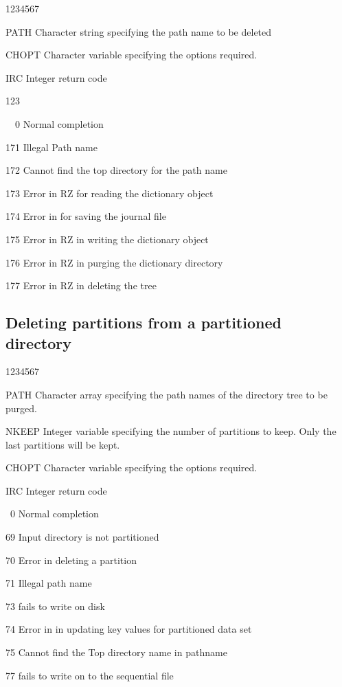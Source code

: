 \begin{DLtt}{1234567}
\item[PATH]Character string specifying the path name
  to be deleted
\item[CHOPT]Character variable specifying the options required.
\item[IRC]Integer return code
  \begin{DLtt}{123}
    \item[\ \ 0]Normal completion
    \item[171]Illegal Path name
    \item[172]Cannot find the top directory for the path name
    \item[173]Error in RZ for reading the dictionary object
    \item[174]Error in  for saving the journal file
    \item[175]Error in RZ in writing the dictionary object
    \item[176]Error in RZ in purging the dictionary directory
    \item[177]Error in RZ in deleting the tree
  \end{DLtt}
\end{DLtt}

\subsection{Deleting partitions from a partitioned directory}


\begin{DLtt}{1234567}
\item[PATH]Character array specifying the path names
  of the directory tree to be purged.
\item[NKEEP]Integer variable specifying the number of
  partitions to keep. Only the last 
  partitions will be kept.
\item[CHOPT]Character variable specifying the options required.
\item[IRC]Integer return code
  \begin{DLtt}{12}
    \item[\ 0]Normal completion
    \item[69]Input directory is not partitioned
    \item[70]Error in deleting a partition
    \item[71]Illegal path name
    \item[73] fails to write on disk
    \item[74]Error in  in updating key values for
      partitioned data set
    \item[75]Cannot find the Top directory name in pathname
    \item[77] fails to write on to the sequential file
  \end{DLtt}
\end{DLtt}

